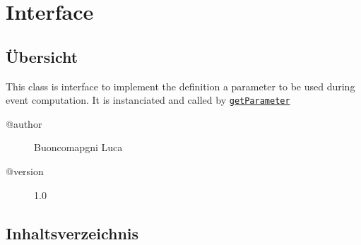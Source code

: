 
\section[OFEventParameterInterface]{Interface }\label{ontologyFramework.OFEventManagement.OFEventParameterInterface-class}
\subsection{Übersicht}
This class is interface to implement the definition a parameter to be used
 during event computation. It is instanciated and called by 
 \texttt{\hyperlink{ontologyFramework.OFEventManagement.OFEventParameterDefinition.getParameter()}{getParameter}}
\begin{description}
\item[@author] 
Buoncomapgni Luca
\item[@version] 
1.0
\end{description}
\subsection{Inhaltsverzeichnis}
